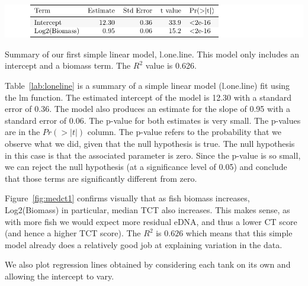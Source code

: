 \begin{table}[H]
\includegraphics{Chapter3Images/lonelinekable.pdf}
\caption{Summary of our first simple linear model,  l.one.line. This model only includes an intercept and a biomass term. The $R^{2}$ value is 0.626.}
\label{lab:loneline}
\end{table}


Table~\ref{lab:loneline} is a summary of a simple linear model (l.one.line)  fit using the lm function. The estimated intercept of the model is 12.30 with a standard error of 0.36. The model also produces an estimate for the slope of 0.95 with a standard error of 0.06.  The p-value for both estimates is very small. The p-values are in the $Pr(>|t|)$ column. The p-value refers to the probability that we observe what we did, given that the null hypothesis is true. The null hypothesis in this case is that the associated parameter is zero. Since the p-value is so small, we can reject the null hypothesis (at a significance level of 0.05) and conclude that those terms are significantly different from zero. 

\vspace{12pt}


Figure~\ref{fig:medct1} confirms visually that as fish biomass increases, Log2(Biomass) in particular, median TCT also increases. This makes sense, as with more fish we would expect more residual eDNA, and thus a lower CT score (and hence a higher TCT score). The $R^{2}$ is $0.626$ which means that this simple model already does a relatively good job at explaining variation in the data.

\newpage

We also plot regression lines obtained by considering each tank on its own and allowing the intercept to vary. 


